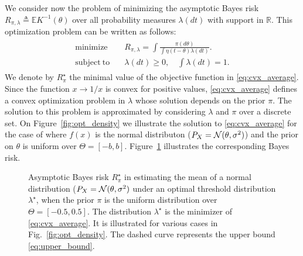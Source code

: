  We consider now the problem of minimizing the asymptotic Bayes risk $
R_{\pi,\lambda} \triangleq \mathbb E  K^{-1}(\theta)$ over all probability measures $\lambda(dt)$ with support in $\mathbb R$. This optimization problem can be written as follows:
\begin{align}
\label{eq:cvx_average}
\begin{split}
\mathrm{minimize} \quad & R_{\pi,\lambda} =  \int \frac{\pi(d\theta)}{ \int \eta \left( t-\theta\right) \lambda(dt)}. \\ 
\mathrm{subject~to} \quad & \lambda(dt)\geq 0,\quad \int \lambda(dt) =1. 
\end{split}
\end{align}
We denote by $R^\star_{\pi}$ the minimal value of the objective function in \eqref{eq:cvx_average}. Since the function $x \rightarrow 1/x$ is convex for positive values, \eqref{eq:cvx_average} defines a convex optimization problem in $\lambda$ whose solution depends on the prior $\pi$. The solution to this problem is approximated by considering $\lambda$ and $\pi$ over a discrete set. On Figure~\ref{fig:opt_density} we illustrate the solution to \eqref{eq:cvx_average} for the case of where $f(x)$ is the normal distributon ($P_X = \mathcal{N}(\theta, \sigma^2)$) and the prior on $\theta$ is uniform over $\Theta = [-b,b]$. Figure~\ref{fig:dist_bound_uniform} illustrates the corresponding Bayes risk. 
\par
\begin{figure}
\begin{center}

\caption{Asymptotic Bayes risk $R_{\pi}^\star$ in estimating the mean of a normal distribution ($P_X = \mathcal{N}(\theta, \sigma^2)$ under an optimal threshold distribution $\lambda^\star$, when the prior $\pi$ is the uniform distribution over $\Theta = [-0.5,0.5]$. 
%
The distribution $\lambda^\star$ is the minimizer of \eqref{eq:cvx_average}. It is illustrated for various cases in Fig.~\ref{fig:opt_density}. The dashed curve represents the upper bound \eqref{eq:upper_bound}. 
\label{fig:dist_bound_uniform}  }
\end{center}
\end{figure}

